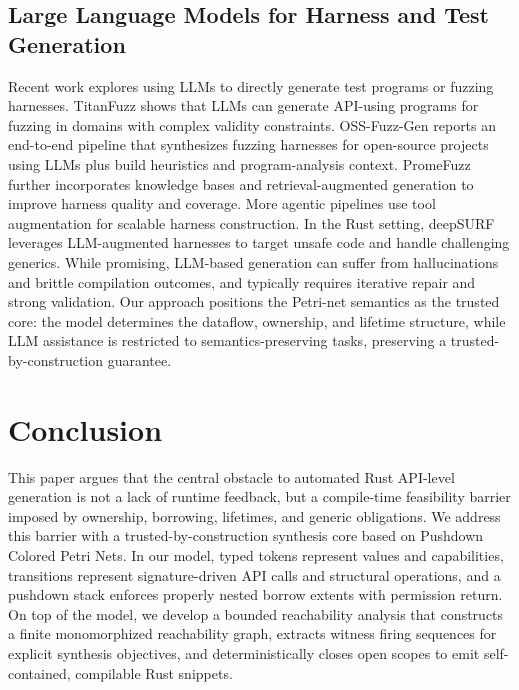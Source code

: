 \documentclass[sigconf]{acmart}
\begin{document}
\subsection{Large Language Models for Harness and Test Generation}
Recent work explores using LLMs to directly generate test programs or fuzzing harnesses. TitanFuzz shows that LLMs can generate API-using programs for fuzzing in domains with complex validity constraints. OSS-Fuzz-Gen reports an end-to-end pipeline that synthesizes fuzzing harnesses for open-source projects using LLMs plus build heuristics and program-analysis context. PromeFuzz further incorporates knowledge bases and retrieval-augmented generation to improve harness quality and coverage. More agentic pipelines use tool augmentation for scalable harness construction.
In the Rust setting, deepSURF leverages LLM-augmented harnesses to target unsafe code and handle challenging generics. While promising, LLM-based generation can suffer from hallucinations and brittle compilation outcomes,
and typically requires iterative repair and strong validation. Our approach positions the Petri-net semantics as the trusted core:
the model determines the dataflow, ownership, and lifetime structure, while LLM assistance is restricted to semantics-preserving tasks, preserving a trusted-by-construction guarantee.

\section{Conclusion}
\label{sec:conclusion}
This paper argues that the central obstacle to automated Rust API-level generation is not a lack of runtime feedback, but a compile-time feasibility barrier imposed by ownership, borrowing, lifetimes, and generic obligations. We address this barrier with a trusted-by-construction synthesis core based on Pushdown Colored Petri Nets. In our model, typed tokens represent values and capabilities, transitions represent signature-driven API calls and structural operations, and a pushdown stack enforces properly nested borrow extents with permission return. On top of the model, we develop a bounded reachability analysis that constructs a finite monomorphized reachability graph, extracts witness firing sequences for explicit synthesis objectives, and deterministically closes open scopes to emit self-contained, compilable Rust snippets.
\end{document}
